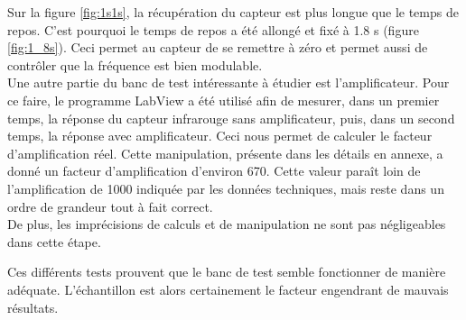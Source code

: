 Sur la figure \ref{fig:1s1s}, la récupération du capteur est plus longue que le temps de repos. C'est pourquoi le temps de repos a été allongé
et fixé à 1.8 s (figure \ref*{fig:1_8s}). Ceci permet au capteur de se remettre à zéro et permet aussi de contrôler que la fréquence est bien
modulable. \\

Une autre partie du banc de test intéressante à étudier est l'amplificateur. Pour ce faire, le programme LabView a été utilisé afin de mesurer, dans un
premier temps, la réponse du capteur \gls{infrarouge} sans amplificateur, puis, dans un second temps, la réponse avec amplificateur. Ceci nous
permet de calculer le facteur d'amplification réel. Cette manipulation, présente dans les détails en annexe, a donné un facteur d'amplification 
d'environ 670. Cette valeur paraît loin de l'amplification de 1000 indiquée par les données techniques, mais reste dans un ordre de grandeur 
tout à fait correct. \\
De plus, les imprécisions de calculs et de manipulation ne sont pas négligeables dans cette étape. 

Ces différents tests prouvent que le banc de test semble fonctionner de manière adéquate. L'échantillon est alors certainement le facteur engendrant de
mauvais résultats. 

